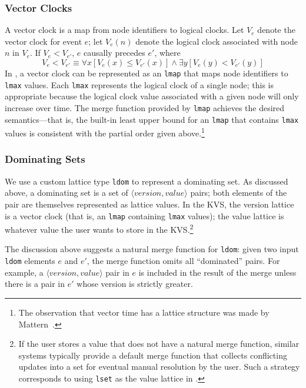 \subsubsection{Vector Clocks}
A vector clock is a map from node identifiers to logical clocks. Let $V_e$
denote the vector clock for event $e$; let $V_e(n)$ denote the logical clock
associated with node $n$ in $V_e$. If $V_e < V_{e'}$, $e$ causally precedes
$e'$, where
\begin{displaymath}
V_e < V_{e'} \equiv \forall x [ V_e(x) \leq V_{e'}(x) ] \land \exists y [ V_e(y) < V_{e'}(y) ]  
\end{displaymath}
In \lang, a vector clock can be represented as an \texttt{lmap} that maps node
identifiers to \texttt{lmax} values. Each \texttt{lmax} represents the logical
clock of a single node; this is appropriate because the logical clock value
associated with a given node will only increase over time. The merge function
provided by \texttt{lmap} achieves the desired semantics---that is, the built-in
least upper bound for an \texttt{lmap} that contains \texttt{lmax} values is
consistent with the partial order given above.\footnote{The observation that
  vector time has a lattice structure was made by Mattern~\cite{Mattern1989}.}

\subsubsection{Dominating Sets}
We use a custom lattice type \texttt{ldom} to represent a dominating set. As
discussed above, a dominating set is a set of
$\langle\textit{version},\textit{value}\rangle$ pairs; both elements of the pair
are themselves represented as lattice values. In the KVS, the version lattice is
a vector clock (that is, an \texttt{lmap} containing \texttt{lmax} values); the
value lattice is whatever value the user wants to store in the KVS.\footnote{If
  the user stores a value that does not have a natural merge function, similar
  systems typically provide a default merge function that collects conflicting
  updates into a set for eventual manual resolution by the user. Such a strategy
  corresponds to using \texttt{lset} as the value lattice in \lang.}

The discussion above suggests a natural merge function for \texttt{ldom}: given
two input \texttt{ldom} elements $e$ and $e'$, the merge function omits all
``dominated'' pairs. For example, a
$\langle\textit{version},\textit{value}\rangle$ pair in $e$ is included in the
result of the merge unless there is a pair in $e'$ whose version is strictly
greater.

